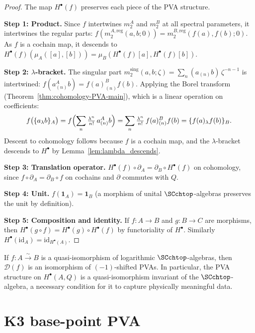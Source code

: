 \begin{proof}
The map $H^\bullet(f)$ preserves each piece of the PVA structure.

\medskip\noindent
\textbf{Step 1: Product.}
Since $f$ intertwines $m_2^A$ and $m_2^B$ at all spectral
parameters, it intertwines the regular parts:
$f(m_2^{A,\mathrm{reg}}(a,b;0)) = m_2^{B,\mathrm{reg}}(f(a),f(b);0)$.
As $f$ is a cochain map, it descends to
$H^\bullet(f)(\mu_A([a],[b])) = \mu_B(H^\bullet(f)[a], H^\bullet(f)[b])$.

\medskip\noindent
\textbf{Step 2: $\lambda$-bracket.}
The singular part $m_2^{\mathrm{sing}}(a,b;\zeta) = \sum_n
(a_{(n)}b)\,\zeta^{-n-1}$ is intertwined:
$f(a_{(n)}^A b) = f(a)_{(n)}^B f(b)$. Applying the Borel
transform (Theorem~\ref{thm:cohomology-PVA-main}), which is
a linear operation on coefficients:
\[
 f\bigl(\{a {}_\lambda b\}_A\bigr)
 = f\Bigl(\sum_n \tfrac{\lambda^n}{n!}\, a_{(n)}^A b\Bigr)
 = \sum_n \tfrac{\lambda^n}{n!}\, f(a)_{(n)}^B f(b)
 = \{f(a) {}_\lambda f(b)\}_B.
\]
Descent to cohomology follows because $f$ is a cochain map, and
the $\lambda$-bracket descends to $H^\bullet$ by
Lemma~\ref{lem:lambda_descends}.

\medskip\noindent
\textbf{Step 3: Translation operator.}
$H^\bullet(f) \circ \partial_A = \partial_B \circ H^\bullet(f)$
on cohomology, since $f \circ \partial_A = \partial_B \circ f$
on cochains and $\partial$ commutes with $Q$.

\medskip\noindent
\textbf{Step 4: Unit.}
$f(\mathbf{1}_A) = \mathbf{1}_B$ (a morphism of unital
$\SCchtop$-algebras preserves the unit by definition).

\medskip\noindent
\textbf{Step 5: Composition and identity.}
If $f \colon A \to B$ and $g \colon B \to C$ are morphisms,
then $H^\bullet(g \circ f) = H^\bullet(g) \circ H^\bullet(f)$
by functoriality of $H^\bullet$. Similarly
$H^\bullet(\mathrm{id}_A) = \mathrm{id}_{H^\bullet(A)}$.
\end{proof}

\begin{remark}
\label{rem:pva-descent-qi}
If $f \colon A \xrightarrow{\sim} B$ is a quasi-isomorphism
of logarithmic $\SCchtop$-algebras, then $\mathcal{D}(f)$ is
an isomorphism of $(-1)$-shifted PVAs. In particular, the PVA
structure on $H^\bullet(A,Q)$ is a quasi-isomorphism invariant
of the $\SCchtop$-algebra, a necessary condition for it to
capture physically meaningful data.
\end{remark}

\section{K3 base-point PVA}
\label{sec:pvadr-supplement}

